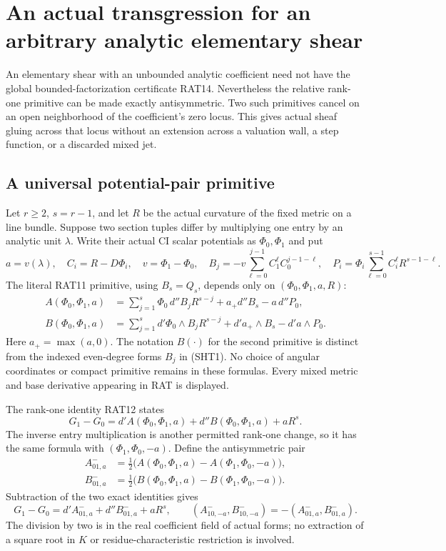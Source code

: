 \section{An actual transgression for an arbitrary analytic elementary shear}
\label{sec:r9-unbounded-analytic-shear-transgression}

An elementary shear with an unbounded analytic coefficient need
not have the global bounded-factorization certificate RAT14.
Nevertheless the relative rank-one primitive can be made exactly
antisymmetric.  Two such primitives cancel on an open neighborhood
of the coefficient's zero locus.  This gives actual sheaf gluing
across that locus without an extension across a valuation wall,
a step function, or a discarded mixed jet.

\subsection{A universal potential-pair primitive}

Let $r\ge2$, $s=r-1$, and let $R$ be the actual curvature
of the fixed metric on a line bundle.  Suppose two section
tuples differ by multiplying one entry by an analytic unit
$\lambda$.  Write their actual CI scalar potentials as
$\Phi_0,\Phi_1$ and put
\[
 a=v(\lambda),\quad C_i=R-D\Phi_i,\quad v=\Phi_1-\Phi_0,
 \quad B_j=-v\sum_{\ell=0}^{j-1}C_1^\ell C_0^{j-1-\ell},
 \quad P_i=\Phi_i\sum_{\ell=0}^{s-1}C_i^\ell R^{s-1-\ell}.
 \tag{SHT1}
\]
The literal RAT11 primitive, using $B_s=Q_s$, depends
only on $(\Phi_0,\Phi_1,a,R)$:
\[
 \begin{split}
 A(\Phi_0,\Phi_1,a)&=
    \sum_{j=1}^s\Phi_0\,d''B_j R^{s-j}
                   +a_+d''B_s-a\,d''P_0,\\
 B(\Phi_0,\Phi_1,a)&=
    \sum_{j=1}^sd'\Phi_0\wedge B_j R^{s-j}
                   +d'a_+\wedge B_s-d'a\wedge P_0.
 \end{split}
 \tag{SHT2}
\]
Here $a_+=\max(a,0)$.  The notation $B(\cdot)$ for
the second primitive is distinct from the indexed
even-degree forms $B_j$ in (SHT1).  No choice of
angular coordinates or compact primitive remains
in these formulas.  Every mixed metric and base
derivative appearing in RAT is displayed.

The rank-one identity RAT12 states
\[
 G_1-G_0=d'A(\Phi_0,\Phi_1,a)
              +d''B(\Phi_0,\Phi_1,a)+aR^s.
 \tag{SHT3}
\]
The inverse entry multiplication is another permitted
rank-one change, so it has the same formula with
$(\Phi_1,\Phi_0,-a)$.  Define the antisymmetric pair
\[
 \begin{split}
 A^-_{01,a}&=\tfrac12\bigl(A(\Phi_0,\Phi_1,a)
                                  -A(\Phi_1,\Phi_0,-a)\bigr),\\
 B^-_{01,a}&=\tfrac12\bigl(B(\Phi_0,\Phi_1,a)
                                  -B(\Phi_1,\Phi_0,-a)\bigr).
 \end{split}
 \tag{SHT4}
\]
Subtraction of the two exact identities gives
\[
 G_1-G_0=d'A^-_{01,a}+d''B^-_{01,a}+aR^s,
       \qquad (A^-_{10,-a},B^-_{10,-a})
                                  =-(A^-_{01,a},B^-_{01,a}).
 \tag{SHT5}
\]
The division by two is in the real coefficient field
of actual forms; no extraction of a square root in
$K$ or residue-characteristic restriction is involved.

